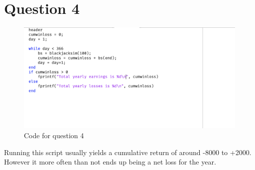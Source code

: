 \documentclass{article}
\begin{document}
\newpage
\section{Question 4}

\begin{figure}[H]
    \centering
    \includegraphics[width=0.8\linewidth]{imgs/q4_code.png}
    \caption{Code for question 4}
\end{figure}

Running this script usually yields a cumulative return of around -8000 to +2000. However it more often than not
ends up being a net loss for the year.
\end{document}
